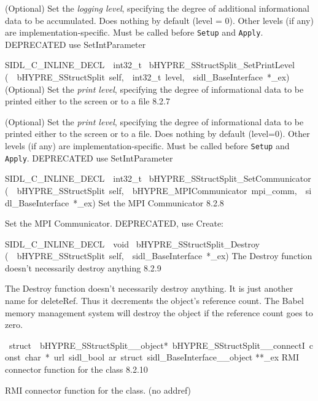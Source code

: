 \documentclass{article}
\begin{document}
\begin{cxxentry}
\begin{cxxentry}
\begin{cxxfunction}
\begin{cxxdoc}
(Optional) Set the {\it logging level}, specifying the degree
of additional informational data to be accumulated.  Does
nothing by default (level = 0).  Other levels (if any) are
implementation-specific.  Must be called before {\tt Setup}
and {\tt Apply}.
DEPRECATED   use SetIntParameter
\end{cxxdoc}
\end{cxxfunction}
\begin{cxxfunction}
{SIDL\_C\_INLINE\_DECL\ \ int32\_t\ }
        {bHYPRE\_SStructSplit\_SetPrintLevel}
        {(\ \ bHYPRE\_SStructSplit\ self,\ \ int32\_t\ level,\ \ sidl\_BaseInterface\ *\_ex)}
        {
(Optional) Set the {\it print level}, specifying the degree
of informational data to be printed either to the screen or
to a file}
        {8.2.7}
\begin{cxxdoc}

(Optional) Set the {\it print level}, specifying the degree
of informational data to be printed either to the screen or
to a file.  Does nothing by default (level=0).  Other levels
(if any) are implementation-specific.  Must be called before
{\tt Setup} and {\tt Apply}.
DEPRECATED   use SetIntParameter
\end{cxxdoc}
\end{cxxfunction}
\begin{cxxfunction}
{SIDL\_C\_INLINE\_DECL\ \ int32\_t\ }
        {bHYPRE\_SStructSplit\_SetCommunicator}
        {(\ \ bHYPRE\_SStructSplit\ self,\ \ bHYPRE\_MPICommunicator\ mpi\_comm,\ \ sidl\_BaseInterface\ *\_ex)}
        {
Set the MPI Communicator}
        {8.2.8}
\begin{cxxdoc}

Set the MPI Communicator.
DEPRECATED, use Create:
\end{cxxdoc}
\end{cxxfunction}
\begin{cxxfunction}
{SIDL\_C\_INLINE\_DECL\ \ void\ }
        {bHYPRE\_SStructSplit\_Destroy}
        {(\ \ bHYPRE\_SStructSplit\ self,\ \ sidl\_BaseInterface\ *\_ex)}
        {
The Destroy function doesn't necessarily destroy anything}
        {8.2.9}
\begin{cxxdoc}

The Destroy function doesn't necessarily destroy anything.
It is just another name for deleteRef.  Thus it decrements the
object's reference count.  The Babel memory management system will
destroy the object if the reference count goes to zero.
\end{cxxdoc}
\end{cxxfunction}
\begin{cxxvariable}
{\ struct\ \ bHYPRE\_SStructSplit\_\_object*\ bHYPRE\_SStructSplit\_\_connectI\ const\ char\ *\ url\ sidl\_bool\ ar\ struct\ sidl\_BaseInterface\_\_object}
        {**\_ex}
        {}
        {
RMI connector function for the class}
        {8.2.10}
\begin{cxxdoc}

RMI connector function for the class. (no addref)
\end{cxxdoc}
\end{cxxvariable}
\end{cxxentry}
\end{cxxentry}
\end{document}
